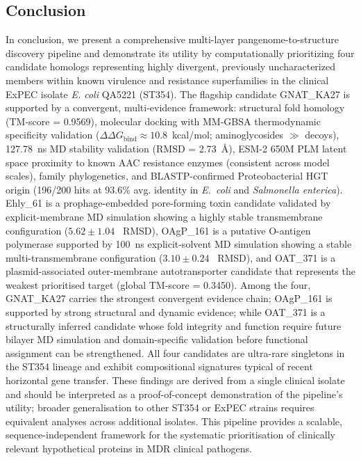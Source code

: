 \documentclass[pdflatex,sn-mathphys-num]{sn-jnl}
\begin{document}
\subsection{Conclusion}
In conclusion, we present a comprehensive multi-layer pangenome-to-structure discovery pipeline and demonstrate its utility by computationally prioritizing four candidate homologs representing highly divergent, previously uncharacterized members within known virulence and resistance superfamilies in the clinical ExPEC isolate \textit{E. coli} QA5221 (ST354). The flagship candidate GNAT\_KA27 is supported by a convergent, multi-evidence framework: structural fold homology (TM-score = 0.9569), molecular docking with MM-GBSA thermodynamic specificity validation ($\Delta\Delta G_{\text{bind}} \approx 10.8$~kcal/mol; aminoglycosides $\gg$ decoys), 127.78~ns MD stability validation (RMSD = 2.73~\AA), ESM-2 650M PLM latent space proximity to known AAC resistance enzymes (consistent across model scales), family phylogenetics, and BLASTP-confirmed Proteobacterial HGT origin (196/200 hits at 93.6\% avg. identity in \textit{E.~coli} and \textit{Salmonella enterica}). Ehly\_61 is a prophage-embedded pore-forming toxin candidate validated by explicit-membrane MD simulation showing a highly stable transmembrane configuration ($5.62 \pm 1.04$~\text{\AA} RMSD), OAgP\_161 is a putative O-antigen polymerase supported by 100~ns explicit-solvent MD simulation showing a stable multi-transmembrane configuration ($3.10 \pm 0.24$~\text{\AA} RMSD), and OAT\_371 is a plasmid-associated outer-membrane autotransporter candidate that represents the weakest prioritised target (global TM-score = 0.3450). Among the four, GNAT\_KA27 carries the strongest convergent evidence chain; OAgP\_161 is supported by strong structural and dynamic evidence; while OAT\_371 is a structurally inferred candidate whose fold integrity and function require future bilayer MD simulation and domain-specific validation before functional assignment can be strengthened. All four candidates are ultra-rare singletons in the ST354 lineage and exhibit compositional signatures typical of recent horizontal gene transfer. These findings are derived from a single clinical isolate and should be interpreted as a proof-of-concept demonstration of the pipeline's utility; broader generalisation to other ST354 or ExPEC strains requires equivalent analyses across additional isolates. This pipeline provides a scalable, sequence-independent framework for the systematic prioritisation of clinically relevant hypothetical proteins in MDR clinical pathogens.
\end{document}
